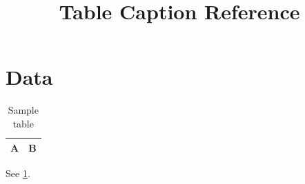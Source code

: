 \documentclass{article}
\begin{document}
\title{Table Caption Reference}\maketitle
\section{Data}\begin{table}[h]\centering\caption{Sample table}\label{tab:s}\begin{tabular}{|l|l|}\hline A&B\\\hline\end{tabular}\end{table} See \ref{tab:s}.
\end{document}
